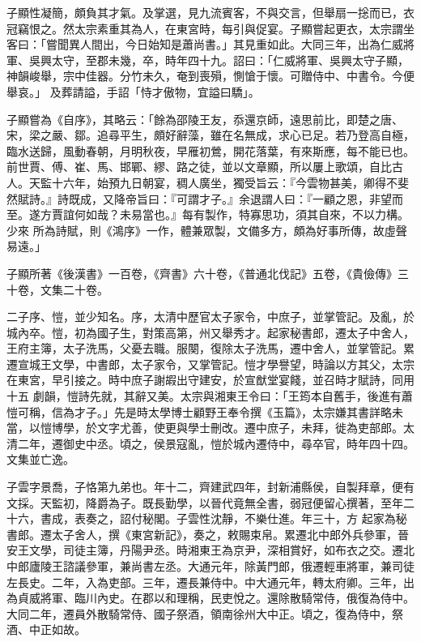 \begin{pinyinscope}
 子顯性凝簡，頗負其才氣。及掌選，見九流賓客，不與交言，但舉扇一捴而已，衣冠竊恨之。然太宗素重其為人，在東宮時，每引與促宴。子顯嘗起更衣，太宗謂坐客曰：「嘗聞異人間出，今日始知是蕭尚書。」其見重如此。大同三年，出為仁威將軍、吳興太守，至郡未幾，卒，時年四十九。詔曰：「仁威將軍、吳興太守子顯，神韻峻舉，宗中佳器。分竹未久，奄到喪殞，惻愴于懷。可贈侍中、中書令。今便舉哀。」
 及葬請謚，手詔「恃才傲物，宜謚曰驕」。



 子顯嘗為《自序》，其略云：「餘為邵陵王友，忝還京師，遠思前比，即楚之唐、宋，梁之嚴、鄒。追尋平生，頗好辭藻，雖在名無成，求心已足。若乃登高自極，臨水送歸，風動春朝，月明秋夜，早雁初鶯，開花落葉，有來斯應，每不能已也。前世賈、傅、崔、馬、邯鄲、繆、路之徒，並以文章顯，所以屢上歌頌，自比古人。天監十六年，始預九日朝宴，稠人廣坐，獨受旨云：『今雲物甚美，卿得不斐然賦詩。』詩既成，又降帝旨曰：『可謂才子。』余退謂人曰：『一顧之恩，非望而至。遂方賈誼何如哉？未易當也。』每有製作，特寡思功，須其自來，不以力構。少來
 所為詩賦，則《鴻序》一作，體兼眾製，文備多方，頗為好事所傳，故虛聲易遠。」



 子顯所著《後漢書》一百卷，《齊書》六十卷，《普通北伐記》五卷，《貴儉傳》三十卷，文集二十卷。



 二子序、愷，並少知名。序，太清中歷官太子家令，中庶子，並掌管記。及亂，於城內卒。愷，初為國子生，對策高第，州又舉秀才。起家秘書郎，遷太子中舍人，王府主簿，太子洗馬，父憂去職。服闋，復除太子洗馬，遷中舍人，並掌管記。累遷宣城王文學，中書郎，太子家令，又掌管記。愷才學譽望，時論以方其父，太宗在東宮，早引接之。時中庶子謝嘏出守建安，於宣猷堂宴餞，並召時才賦詩，同用十五
 劇韻，愷詩先就，其辭又美。太宗與湘東王令曰：「王筠本自舊手，後進有蕭愷可稱，信為才子。」先是時太學博士顧野王奉令撰《玉篇》，太宗嫌其書詳略未當，以愷博學，於文字尤善，使更與學士刪改。遷中庶子，未拜，徙為吏部郎。太清二年，遷御史中丞。頃之，侯景寇亂，愷於城內遷侍中，尋卒官，時年四十四。文集並亡逸。



 子雲字景喬，子恪第九弟也。年十二，齊建武四年，封新浦縣侯，自製拜章，便有文採。天監初，降爵為子。既長勤學，以晉代竟無全書，弱冠便留心撰著，至年二十六，書成，表奏之，詔付秘閣。子雲性沈靜，不樂仕進。年三十，方
 起家為秘書郎。遷太子舍人，撰《東宮新記》，奏之，敕賜束帛。累遷北中郎外兵參軍，晉安王文學，司徒主簿，丹陽尹丞。時湘東王為京尹，深相賞好，如布衣之交。遷北中郎廬陵王諮議參軍，兼尚書左丞。大通元年，除黃門郎，俄遷輕車將軍，兼司徒左長史。二年，入為吏部。三年，遷長兼侍中。中大通元年，轉太府卿。三年，出為貞威將軍、臨川內史。在郡以和理稱，民吏悅之。還除散騎常侍，俄復為侍中。大同二年，遷員外散騎常侍、國子祭酒，領南徐州大中正。頃之，復為侍中，祭酒、中正如故。




\end{pinyinscope}
